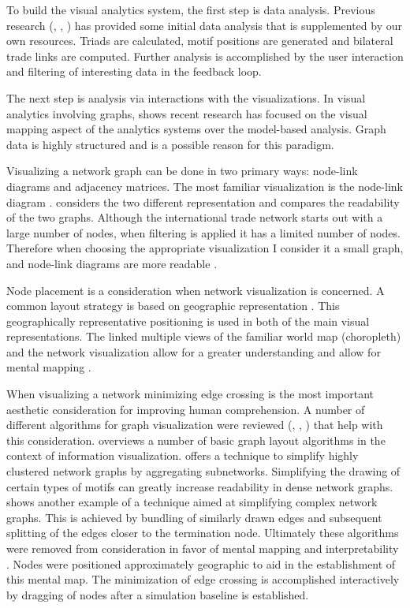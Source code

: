 To build the visual analytics system, the first step is data analysis. Previous research (\cite{zhou2016structure}, \cite{shutters2012agricultural}, \cite{squartini2012triadic}) has provided some initial data analysis that is supplemented by our own resources. Triads are calculated, motif positions are generated and bilateral trade links are computed. Further analysis is accomplished by the user interaction and filtering of interesting data in the feedback loop.\par
The next step is analysis via interactions with the visualizations. In visual analytics involving graphs, \cite{sun2013survey} shows recent research has focused on the visual mapping aspect of the analytics systems over the model-based analysis. Graph data is highly structured and is a possible reason for this paradigm.\par
Visualizing a network graph can be done in two primary ways: node-link diagrams and adjacency matrices. The most familiar visualization is the node-link diagram . \cite{ghoniem2004comparison} considers the two different representation and compares the readability of the two graphs. Although the international trade network starts out with a large number of nodes, when filtering is applied \citep{shneiderman1996eyes} it has a limited number of nodes. Therefore when choosing the appropriate visualization I consider it a small graph, and node-link diagrams are more readable \citep{ghoniem2004comparison}.\par
Node placement is a consideration when network visualization is concerned. A common layout strategy is based on geographic representation \citep{shneiderman2006network}. This geographically representative positioning is used in both of the main visual representations. The linked multiple views of the familiar world map (choropleth) and the network visualization allow for a greater understanding \citep{rodgers2005graph} and allow for mental mapping \citep{eades1991preserving}.\par
When visualizing a network minimizing edge crossing is the most important aesthetic consideration \citep{purchase1997aesthetic} for improving human comprehension. A number of different algorithms for graph visualization were reviewed (\cite{herman2000graph}, \cite{dunne2013motif}, \cite{holten2009force}) that help with this consideration. \cite{herman2000graph} overviews a number of basic graph layout algorithms in the context of information visualization. \cite{dunne2013motif} offers a technique to simplify highly clustered network graphs by aggregating subnetworks. Simplifying the drawing of certain types of motifs can greatly increase readability in dense network graphs. \cite{holten2009force} shows another example of a technique aimed at simplifying complex network graphs. This is achieved by bundling of similarly drawn edges and subsequent splitting of the edges closer to the termination node. Ultimately these algorithms were removed from consideration in favor of mental mapping \citep{eades1991preserving} and interpretability \citep{keim2008visual}. Nodes were positioned approximately geographic to aid in the establishment of this mental map. The minimization of edge crossing is accomplished interactively by dragging of nodes after a simulation baseline is established.\par
